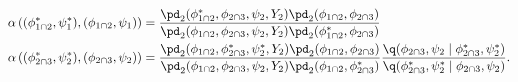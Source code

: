 \begin{align}
  \alpha \left((\phi_{1 \cap 2}^{*}, \psi_{1}^{*}), (\phi_{1 \cap 2}, \psi_{1})\right) &= 
  \frac {
    \pd_{2}(\phi_{1 \cap 2}^{*}, \phi_{2 \cap 3}, \psi_{2}, Y_{2})
    \pd_{2}(\phi_{1 \cap 2}, \phi_{2 \cap 3})
  } {
    \pd_{2}(\phi_{1 \cap 2}, \phi_{2 \cap 3}, \psi_{2}, Y_{2})
    \pd_{2}(\phi_{1 \cap 2}^{*}, \phi_{2 \cap 3})
  } 
  \label{eqn:stage-two-acceptance-probabilities-one}
  \\
  \alpha \left((\phi_{2 \cap 3}^{*}, \psi_{2}^{*}), (\phi_{2 \cap 3}, \psi_{2})\right) &= 
  \frac {
    \pd_{2}(\phi_{1 \cap 2}, \phi_{2 \cap 3}^{*}, \psi_{2}^{*}, Y_{2})
    \pd_{2}(\phi_{1 \cap 2}, \phi_{2 \cap 3})
  } {
    \pd_{2}(\phi_{1 \cap 2}, \phi_{2 \cap 3}, \psi_{2}, Y_{2})
    \pd_{2}(\phi_{1 \cap 2}, \phi_{2 \cap 3}^{*})
  }
  \frac {
    \q(\phi_{2 \cap 3}, \psi_{2} \mid \phi_{2 \cap 3}^{*}, \psi_{2}^{*})
  } {
    \q(\phi_{2 \cap 3}^{*}, \psi_{2}^{*} \mid \phi_{2 \cap 3}, \psi_{2})
  }.
  \label{eqn:stage-two-acceptance-probabilities-two}
\end{align}